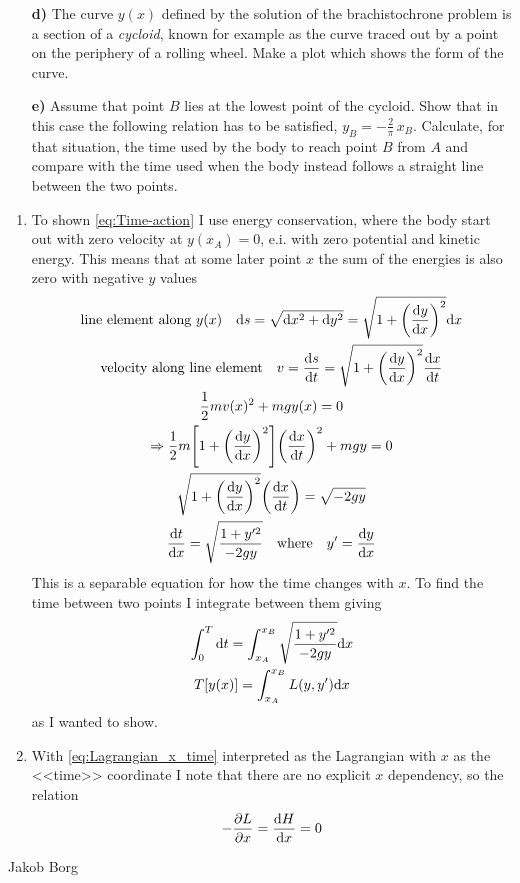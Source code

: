 \documentclass[11pt,a4paper]{report}
\newcounter{excount}[chapter]
\newenvironment{exercise}[1][]{\addtocounter{excount}{1} \noindent {\bf Problem
    \arabic{excount} \ \ #1}\hspace{2mm}}{\vspace{4mm}}
\newenvironment{solution}
    {\begin{tcolorbox}[title=Solution,halign lower=right,breakable]
    }
    {
    \tcblower Jakob Borg
    \end{tcolorbox}
	\vspace{5mm}
    }
\newcommand{\half}
{
\frac{1}{2}
}
\newcommand{\Lpdv}[1]
{
\pdv{L}{#1}
}
\begin{document}
\begin{exercise}[Midterm Exam 2008]
\begin{itemize}
\item[\bf d)]  The curve $y(x)$ defined by the solution of the brachistochrone problem is a section of a {\em cycloid}, known for example as the curve traced out by a point on the periphery of a rolling wheel. Make a plot which shows the form of the curve. 
\item[\bf e)] Assume that point $B$ lies at the lowest point of the cycloid. Show that in this case the following relation has to be satisfied,  $y_B=-\frac{2}{\pi} \,x_B$. Calculate, for that situation, the time used by the body to reach point $B$ from $A$ and compare with the time used when the body instead follows a straight  line between the two points.
\end{itemize}
\begin{solution}
\begin{enumerate}[\bf a)]
\item To shown \cref{eq:Time-action} I use energy conservation, where the body start out with zero velocity at $y(x_A) = 0$, e.i. with zero potential and kinetic energy. This means that at some later point $x$ the sum of the energies is also zero with negative $y$ values
\begin{gather*}
\qq*{line element along $y(x)$} \dd s = \sqrt{\dd x^2 + \dd y^2} = \sqrt{1+\qty(\dv{y}{x})^2}\dd x
\\
\qq*{velocity along line element} v = \dv{s}{t} = \sqrt{1+\qty(\dv{y}{x})^2}\dv{x}{t}
\\
\half m v(x)^2 + mgy(x) = 0
\\
\Rightarrow \half m \qty[1 + \qty(\dv{y}{x})^2]\qty(\dv{x}{t})^2 + mgy = 0
\\
\sqrt{1 + \qty(\dv{y}{x})^2}\qty(\dv{x}{t})  = \sqrt{-2gy}
\\
\dv{t}{x} = \sqrt{\frac{1+y'^2}{-2gy}} \qq{where} y' = \dv{y}{x}
\end{gather*}
This is a separable equation for how the time changes with $x$. To find the time between two points I integrate between them giving
\begin{gather}
\int_0^T \dd t = \int_{x_A}^{x_B} \sqrt{\frac{1+y'^2}{-2gy}} \dd x  \label{eq:Timeeq}
\\
T[y(x)] = \int_{x_A}^{x_B} L(y,y') \dd x \notag
\end{gather}
as I wanted to show.
\item With \cref{eq:Lagrangian_x_time} interpreted as the Lagrangian with $x$ as the <<time>> coordinate I note that there are no explicit $x$ dependency, so the relation
\[ -\Lpdv{x} = \dv{H}{x} = 0 \]

\end{enumerate}
\end{solution}
\end{exercise}
\end{document}
